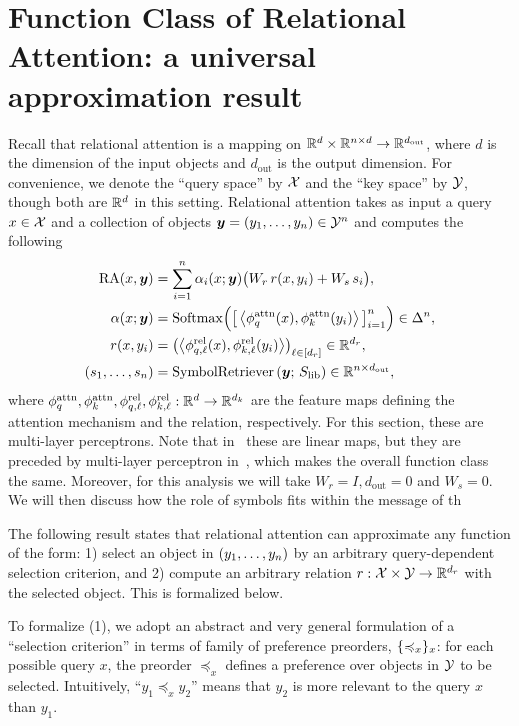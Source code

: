 \section{Function Class of Relational Attention: a universal approximation result}\label{sec:approx}

Recall that relational attention is a mapping on $\mathbb{R}^d \times \mathbb{R}^{n \times d} \to \mathbb{R}^{d_{\mathrm{out}}}$, where $d$ is the dimension of the input objects and $d_{\mathrm{out}}$ is the output dimension. For convenience, we denote the ``query space'' by ${\mathcal{X}}$ and the ``key space'' by ${\mathcal{Y}}$, though both are $\mathbb{R}^d$ in this setting. Relational attention takes as input a query $x \in {\mathcal{X}}$ and a collection of objects $\bm{y} = (y_1, \ldots, y_n) \in {\mathcal{Y}}^n$ and computes the following
\begin{align}
  \mathrm{RA}(x, \bm{y}) &= \sum_{i=1}^{n} \alpha_i(x; \bm{y}) \big(W_r \, r(x, y_i) + W_s \, s_i\big), \\
  \alpha(x; \bm{y}) &= \mathrm{Softmax}\Big(\big[\left \langle \phi_q^{\mathrm{attn}}(x), \phi_k^{\mathrm{attn}}(y_i) \right\rangle\big]_{i=1}^{n}\Big) \in \Delta^n, \\
  r(x, y_i) &= \left(\left \langle \phi_{q,\ell}^{\mathrm{rel}}(x), \phi_{k,\ell}^{\mathrm{rel}}(y_i) \right\rangle\right)_{\ell \in [d_r]} \in \mathbb{R}^{d_r}, \\
  (s_1, \ldots, s_n) &= \mathrm{SymbolRetriever}\left(\bm{y};\, S_\mathrm{lib}\right) \in \mathbb{R}^{n \times d_{\mathrm{out}}},
\end{align}
where $\phi_q^{\mathrm{attn}}, \phi_k^{\mathrm{attn}}, \phi_{q,\ell}^{\mathrm{rel}}, \phi_{k,\ell}^{\mathrm{rel}}: \mathbb{R}^{d} \to \mathbb{R}^{d_k}$ are the feature maps defining the attention mechanism and the relation, respectively. For this section, these are multi-layer perceptrons. Note that in~ these are linear maps, but they are preceded by multi-layer perceptron in~, which makes the overall function class the same. Moreover, for this analysis we will take $W_r = I, d_{\mathrm{out}} = 0$ and $W_s = 0$. We will then discuss how the role of symbols fits within the message of th

The following result states that relational attention can approximate any function of the form: 1) select an object in $(y_1, \ldots, y_n)$ by an arbitrary query-dependent selection criterion, and 2) compute an arbitrary relation $r: {\mathcal{X}} \times {\mathcal{Y}} \to \mathbb{R}^{d_r}$ with the selected object. This is formalized below.

To formalize (1), we adopt an abstract and very general formulation of a ``selection criterion'' in terms of family of preference preorders, $\{\preccurlyeq_x\}_x$: for each possible query $x$, the preorder $\preceq_x$ defines a preference over objects in ${\mathcal{Y}}$ to be selected. Intuitively, ``$y_1 \preceq_x y_2$'' means that $y_2$ is more relevant to the query $x$ than $y_1$.

